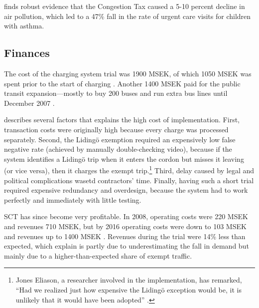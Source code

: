 \citet{Simeonova2017} finds robust evidence that the Congestion Tax caused a 5-10 percent decline in air pollution, which led to a 47\% fall in the rate of urgent care visits for children with asthma.



\subsection{Finances}

The cost of the charging system trial was 1900 MSEK, of which 1050 MSEK was spent prior to the start of charging \citep{Eliasson2009}. Another 1400 MSEK paid for the public transit expansion---mostly to buy 200 buses and run extra bus lines until December 2007 \citep[p. 398]{Eliasson2008}.

\citet{Hamilton2011} describes several factors that explains the high cost of implementation. First, transaction costs were originally high because every charge was processed separately. Second, the Liding\"o exemption required an expensively low false negative rate (achieved by manually double-checking video), because if the system identifies a Liding\"o trip when it enters the cordon but misses it leaving (or vice versa), then it charges the exempt trip.\footnote{Jones Eliason, a researcher involved in the implementation, has remarked, ``Had we realized just how expensive the Liding\"o exception would be, it is unlikely that it would have been adopted'' \citep[p. 217]{Eliasson2009b}.} Third, delay caused by legal and political complications wasetd contractors' time. Finally, having such a short trial required expensive redundancy and overdesign, because the system had to work perfectly and immediately with little testing.


 SCT has since become very profitable. In 2008, operating costs were 220 MSEK and revenues 710 MSEK, but by 2016 operating costs were down to 103 MSEK and revenues up to 1400 MSEK \citep[p. 40]{Borjesson2018}. Revenues during the trial were 14\% less than expected, which \citet{Eliasson2013} explain is partly due to underestimating the fall in demand but mainly due to a higher-than-expected share of exempt traffic.
